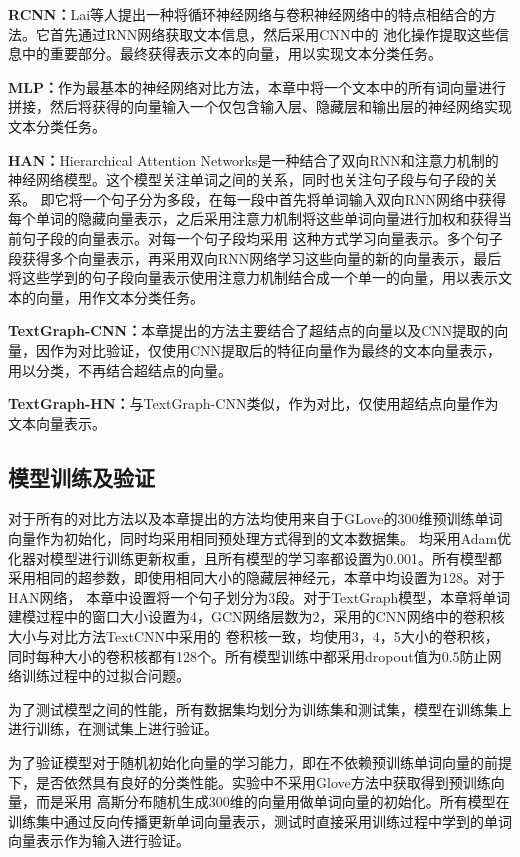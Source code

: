 \textbf{RCNN：}Lai等人提出一种将循环神经网络与卷积神经网络中的特点相结合的方法。它首先通过RNN网络获取文本信息，然后采用CNN中的
池化操作提取这些信息中的重要部分。最终获得表示文本的向量，用以实现文本分类任务。

\textbf{MLP：}作为最基本的神经网络对比方法，本章中将一个文本中的所有词向量进行拼接，然后将获得的向量输入一个仅包含输入层、隐藏层和输出层的神经网络实现文本分类任务。

\textbf{HAN：}Hierarchical Attention Networks是一种结合了双向RNN和注意力机制的神经网络模型。这个模型关注单词之间的关系，同时也关注句子段与句子段的关系。
即它将一个句子分为多段，在每一段中首先将单词输入双向RNN网络中获得每个单词的隐藏向量表示，之后采用注意力机制将这些单词向量进行加权和获得当前句子段的向量表示。对每一个句子段均采用
这种方式学习向量表示。多个句子段获得多个向量表示，再采用双向RNN网络学习这些向量的新的向量表示，最后将这些学到的句子段向量表示使用注意力机制结合成一个单一的向量，用以表示文本的向量，用作文本分类任务。

\textbf{TextGraph-CNN：}本章提出的方法主要结合了超结点的向量以及CNN提取的向量，因作为对比验证，仅使用CNN提取后的特征向量作为最终的文本向量表示，用以分类，不再结合超结点的向量。

\textbf{TextGraph-HN：}与TextGraph-CNN类似，作为对比，仅使用超结点向量作为文本向量表示。
\subsection{模型训练及验证}
对于所有的对比方法以及本章提出的方法均使用来自于GLove的300维预训练单词向量作为初始化，同时均采用相同预处理方式得到的文本数据集。
均采用Adam优化器对模型进行训练更新权重，且所有模型的学习率都设置为0.001。所有模型都采用相同的超参数，即使用相同大小的隐藏层神经元，本章中均设置为128。对于HAN网络，
本章中设置将一个句子划分为3段。对于TextGraph模型，本章将单词建模过程中的窗口大小设置为4，GCN网络层数为2，采用的CNN网络中的卷积核大小与对比方法TextCNN中采用的
卷积核一致，均使用3，4，5大小的卷积核，同时每种大小的卷积核都有128个。所有模型训练中都采用dropout值为0.5防止网络训练过程中的过拟合问题。

为了测试模型之间的性能，所有数据集均划分为训练集和测试集，模型在训练集上进行训练，在测试集上进行验证。

为了验证模型对于随机初始化向量的学习能力，即在不依赖预训练单词向量的前提下，是否依然具有良好的分类性能。实验中不采用Glove方法中获取得到预训练向量，而是采用
高斯分布随机生成300维的向量用做单词向量的初始化。所有模型在训练集中通过反向传播更新单词向量表示，测试时直接采用训练过程中学到的单词向量表示作为输入进行验证。

